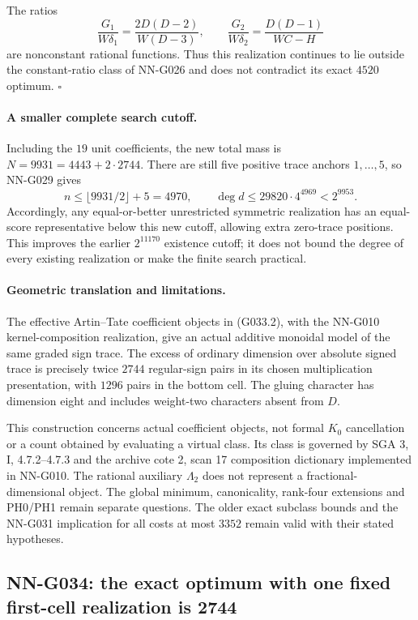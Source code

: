 The ratios
\[
 \frac{G_1}{W\delta_1}
   =\frac{2D(D-2)}{W(D-3)},\qquad
 \frac{G_2}{W\delta_2}=\frac{D(D-1)}{WC-H}
\]
are nonconstant rational functions. Thus this realization
continues to lie outside the constant-ratio class of
NN-G026 and does not contradict its exact $4520$ optimum.
\hfill$\square$

\paragraph{A smaller complete search cutoff.}
Including the $19$ unit coefficients, the new total mass
is $N=9931=4443+2\cdot2744$. There are still five positive
trace anchors $1,\ldots,5$, so NN-G029 gives
\[
 n\le\lfloor9931/2\rfloor+5=4970,\qquad
 \deg d\le29820\cdot4^{4969}<2^{9953}.              \tag{G033.4}
\]
Accordingly, any equal-or-better unrestricted symmetric
realization has an equal-score representative below
this new cutoff, allowing extra zero-trace positions.
This improves the earlier $2^{11170}$ existence cutoff;
it does not bound the degree of every existing realization
or make the finite search practical.

\paragraph{Geometric translation and limitations.}
The effective Artin--Tate coefficient objects in
(G033.2), with the NN-G010 kernel-composition realization,
give an actual additive monoidal model of the same
graded sign trace. The excess of ordinary dimension
over absolute signed trace is precisely twice $2744$
regular-sign pairs in its chosen multiplication
presentation, with $1296$ pairs in the bottom cell.
The gluing character has dimension eight and includes
weight-two characters absent from $D$.

This construction concerns actual coefficient objects,
not formal $K_0$ cancellation or a count obtained by
evaluating a virtual class. Its class is governed by
SGA 3, I, 4.7.2--4.7.3 and the archive cote 2, scan 17
composition dictionary implemented in NN-G010.
The rational auxiliary $\Lambda_2$ does not represent
a fractional-dimensional object. The global minimum,
canonicality, rank-four extensions and PH0/PH1 remain
separate questions. The older exact subclass bounds
and the NN-G031 implication for all costs at most
$3352$ remain valid with their stated hypotheses.


\subsection{NN-G034: the exact optimum with one fixed first-cell realization is 2744}
